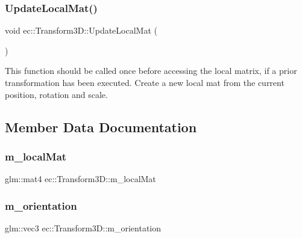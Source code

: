 \subsubsection{\texorpdfstring{Update\+Local\+Mat()}{UpdateLocalMat()}}
{\footnotesize\ttfamily void ec\+::\+Transform3\+D\+::\+Update\+Local\+Mat (\begin{DoxyParamCaption}{ }\end{DoxyParamCaption})}

This function should be called once before accessing the local matrix, if a prior transformation has been executed. Create a new local mat from the current position, rotation and scale. 

\subsection{Member Data Documentation}
\mbox{\label{classec_1_1_transform3_d_a3db99e0bf5af6dcbd68d18badcbf615e}} 
\subsubsection{\texorpdfstring{m\+\_\+local\+Mat}{m\_localMat}}
{\footnotesize\ttfamily glm\+::mat4 ec\+::\+Transform3\+D\+::m\+\_\+local\+Mat\hspace{0.3cm}{\ttfamily [protected]}}

\mbox{\label{classec_1_1_transform3_d_aef0dbda6a07519263c5ad7e617bec33c}} 
\subsubsection{\texorpdfstring{m\+\_\+orientation}{m\_orientation}}
{\footnotesize\ttfamily glm\+::vec3 ec\+::\+Transform3\+D\+::m\+\_\+orientation\hspace{0.3cm}{\ttfamily [protected]}}

\mbox{\label{classec_1_1_transform3_d_a5bba8c29bb22d2b122b64b51b52335f7}} 
